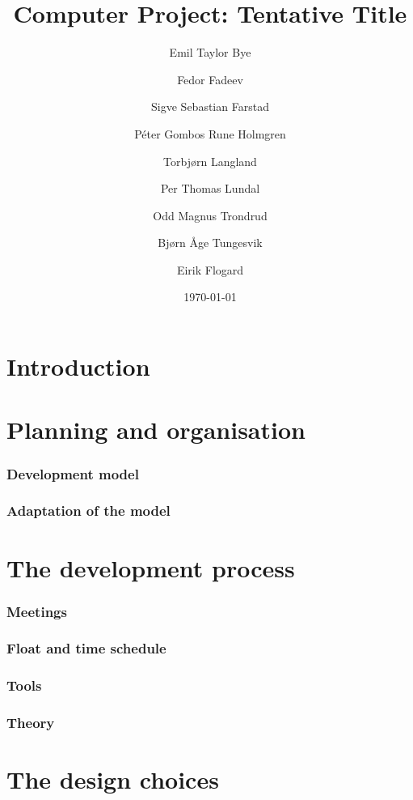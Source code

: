 \documentclass{report}
\title{Computer Project: Tentative Title}
\date{\today}
\author{Emil Taylor Bye
     \and Fedor Fadeev
     \and Sigve Sebastian Farstad
     \and Péter Gombos Rune Holmgren
     \and Torbjørn Langland
     \and Per Thomas Lundal
     \and Odd Magnus Trondrud
     \and Bjørn Åge Tungesvik
     \and Eirik Flogard
}
\begin{document}
\maketitle

\begin{abstract}
	
\end{abstract}

\tableofcontents
\part{Introduction}
	

\part{Planning and organisation}
\section{Development model}
	
\section{Adaptation of the model}
	

\part{The development process}

\section{Meetings}
	
\section{Float and time schedule}
\section{Tools}
\section{Theory}

\part{The design choices}
\end{document}
